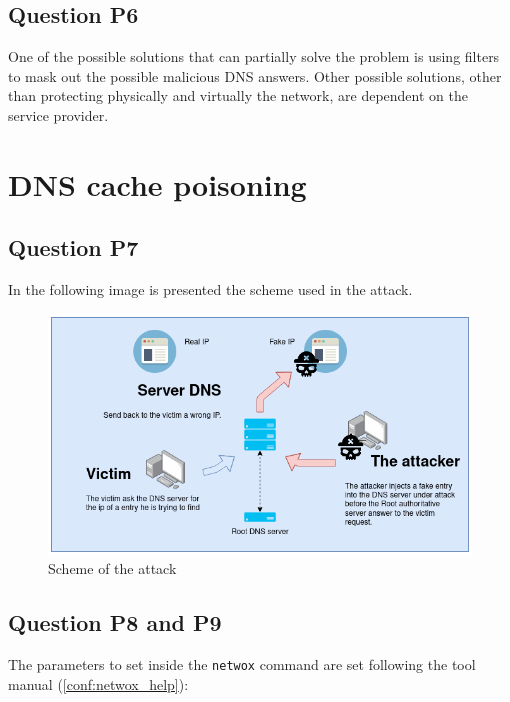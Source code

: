 \inputminted{text}{after_hijacking.txt}
\label{conf:during_hijacking}

\subsection{Question P6}
One of the possible solutions that can partially solve the problem is using filters to mask out the possible malicious DNS answers. Other possible solutions, other than protecting physically and virtually the network, are dependent on the service provider.


\section{DNS cache poisoning}

\subsection{Question P7}
In the following image is presented the scheme used in the attack.

\begin{figure}[H]
	\centering
	\includegraphics[width=\linewidth]{images/cache_poisoning_scheme.png}
	\caption{Scheme of the attack}
	\label{fig:cache_poisopning_attack}
\end{figure}

\subsection{Question P8 and P9}
The parameters to set inside the \texttt{netwox} command are  set following the tool manual (\ref{conf:netwox_help}):

\inputminted{text}{netwox_help.txt}
\label{conf:netwox_help}

